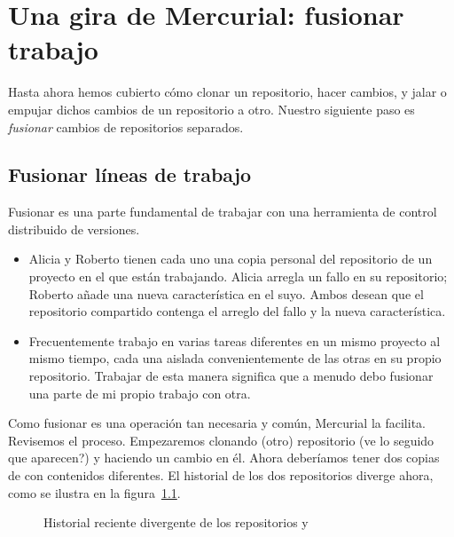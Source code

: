 \chapter{Una gira de Mercurial: fusionar trabajo}
\label{chap:tour-merge}

Hasta ahora hemos cubierto cómo clonar un repositorio, hacer cambios,
y jalar o empujar dichos cambios de un repositorio a otro. Nuestro
siguiente paso es \emph{fusionar} cambios de repositorios separados.

\section{Fusionar líneas de trabajo}

Fusionar es una parte fundamental de trabajar con una herramienta 
de control distribuido de versiones.
\begin{itemize}
\item Alicia y Roberto tienen cada uno una copia personal del
    repositorio de un proyecto en el que están trabajando. Alicia
    arregla un fallo en su repositorio; Roberto añade una nueva
    característica en el suyo. Ambos desean que el repositorio
    compartido contenga el arreglo del fallo y la nueva
    característica.
\item Frecuentemente trabajo en varias tareas diferentes en un mismo
    proyecto al mismo tiempo, cada una aislada convenientemente de las
    otras en su propio repositorio. Trabajar de esta manera significa
    que a menudo debo fusionar una parte de mi propio trabajo con
    otra.
\end{itemize}

Como fusionar es una operación tan necesaria y común, Mercurial la
facilita. Revisemos el proceso. Empezaremos clonando (otro)
repositorio (ve lo seguido que aparecen?) y haciendo un cambio en él.
Ahora deberíamos tener dos copias de  con contenidos
diferentes.  El historial de los dos repositorios diverge ahora, como
se ilustra en la figura~\ref{fig:tour-merge:sep-repos}.

\begin{figure}[ht]
  \centering
  \caption{Historial reciente divergente de los repositorios
       y }
  \label{fig:tour-merge:sep-repos}
\end{figure}

